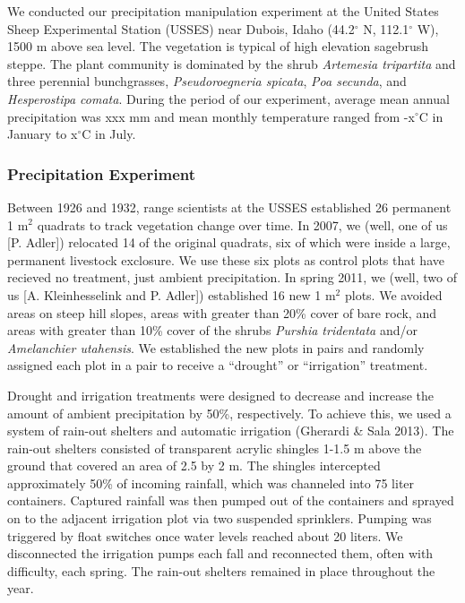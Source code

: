 \documentclass[12pt,]{article}
\begin{document}
We conducted our precipitation manipulation experiment at the United
States Sheep Experimental Station (USSES) near Dubois, Idaho
(44.2\(^{\circ}\) N, 112.1\(^{\circ}\) W), 1500 m above sea level. The
vegetation is typical of high elevation sagebrush steppe. The plant
community is dominated by the shrub \emph{Artemesia tripartita} and
three perennial bunchgrasses, \emph{Pseudoroegneria spicata}, \emph{Poa
secunda}, and \emph{Hesperostipa comata}. During the period of our
experiment, average mean annual precipitation was xxx mm and mean
monthly temperature ranged from -x\(^{\circ}\)C in January to
x\(^{\circ}\)C in July.

\subsubsection{Precipitation Experiment}\label{precipitation-experiment}

Between 1926 and 1932, range scientists at the USSES established 26
permanent 1 m\(^2\) quadrats to track vegetation change over time. In
2007, we (well, one of us {[}P. Adler{]}) relocated 14 of the original
quadrats, six of which were inside a large, permanent livestock
exclosure. We use these six plots as control plots that have recieved no
treatment, just ambient precipitation. In spring 2011, we (well, two of
us {[}A. Kleinhesselink and P. Adler{]}) established 16 new 1 m\(^2\)
plots. We avoided areas on steep hill slopes, areas with greater than
20\% cover of bare rock, and areas with greater than 10\% cover of the
shrubs \emph{Purshia tridentata} and/or \emph{Amelanchier utahensis}. We
established the new plots in pairs and randomly assigned each plot in a
pair to receive a ``drought'' or ``irrigation'' treatment.

Drought and irrigation treatments were designed to decrease and increase
the amount of ambient precipitation by 50\%, respectively. To achieve
this, we used a system of rain-out shelters and automatic irrigation
(Gherardi \& Sala 2013). The rain-out shelters consisted of transparent
acrylic shingles 1-1.5 m above the ground that covered an area of 2.5 by
2 m. The shingles intercepted approximately 50\% of incoming rainfall,
which was channeled into 75 liter containers. Captured rainfall was then
pumped out of the containers and sprayed on to the adjacent irrigation
plot via two suspended sprinklers. Pumping was triggered by float
switches once water levels reached about 20 liters. We disconnected the
irrigation pumps each fall and reconnected them, often with difficulty,
each spring. The rain-out shelters remained in place throughout the
year.
\end{document}
